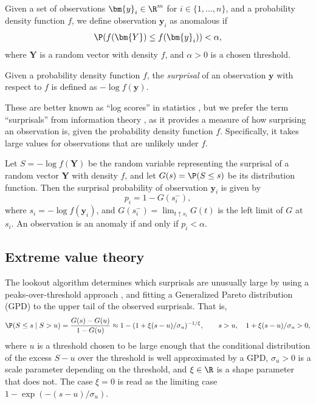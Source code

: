 \begin{defn}[Anomalies]
  Given a set of observations $\bm{y}_{i} \in \R^m$ for $i \in \{1, \dots, n\}$, and a probability density function $f$, we define observation $\bm{y}_i$ as anomalous if
  \begin{equation}
    \P(f(\bm{Y}) \le f(\bm{y}_{i})) < \alpha,
  \end{equation}
  where $\bm{Y}$ is a random vector with density $f$, and $\alpha>0$ is a chosen threshold.
\end{defn}

\begin{defn}[Surprisals]
  Given a probability density function $f$, the \emph{surprisal} of an observation $\bm{y}$ with respect to $f$ is defined as $-\log f(\bm{y})$.
\end{defn}
These are better known as  ``log scores'' in statistics \citep{Good1952-zw}, but we prefer the term ``surprisals'' from information theory \citep{Stone2022}, as it provides a measure of how surprising an observation is, given the probability density function $f$. Specifically, it takes large values for observations that are unlikely under $f$.

Let $S = -\log f(\bm{Y})$ be the random variable representing the surprisal of a random vector $\bm{Y}$ with density $f$, and let $G(s) = \P(S\le s)$ be its distribution function. Then the surprisal probability of observation $\bm{y}_i$ is given by
$$p_i = 1 - G(s_i^-),$$
where $s_i = -\log f (\bm{y}_i)$, and $G(s_i^-) = \lim_{t \uparrow s_i} G(t)$ is the left limit of $G$ at $s_i$. An observation is an anomaly if and only if $p_i < \alpha$.

\subsection{Extreme value theory}

The lookout algorithm determines which surprisals are unusually large by using a peaks-over-threshold approach \citep{Pickands1975,coles2001introduction}, and fitting a Generalized Pareto distribution (GPD) to the upper tail of the observed surprisals. That is,
\begin{equation}\label{eq:POT4}
  \P(S \le s \mid S > u) = \frac{G(s) - G(u)}{1 - G(u)}
  \approx 1 - (1 + \xi (s-u)/\sigma_u)^{-1/\xi}, \qquad s > u, \quad 1 + \xi (s-u)/\sigma_u > 0,
\end{equation}
where $u$ is a threshold chosen to be large enough that the conditional distribution of the excess $S-u$ over the threshold is well approximated by a GPD, $\sigma_u > 0$ is a scale parameter depending on the threshold, and $\xi \in \R$ is a shape parameter that does not. The case $\xi = 0$ is read as the limiting case $1 - \exp(-(s-u)/\sigma_u)$.

